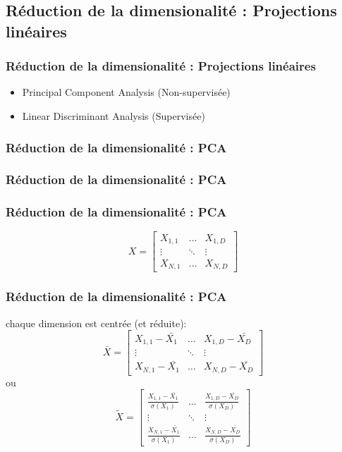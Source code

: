 \subsection{Réduction de la dimensionalité : Projections linéaires}

\begin{frame}
  \frametitle{Réduction de la dimensionalité : Projections linéaires}
    \begin{itemize}
    \item Principal Component Analysis (Non-supervisée)
    \item Linear Discriminant Analysis (Supervisée)
    \end{itemize}
\end{frame}

\begin{frame}
  \frametitle{Réduction de la dimensionalité : PCA}
\end{frame}

\begin{frame}
  \frametitle{Réduction de la dimensionalité : PCA}
\end{frame}

\begin{frame}
  \frametitle{Réduction de la dimensionalité : PCA}
  \[
  X = \begin{bmatrix}
    X_{1,1} & \dots  & X_{1,D} \\
    \vdots & \ddots & \vdots \\
    X_{N,1} & \dots  & X_{N,D}
  \end{bmatrix}
  \]
\end{frame}

\begin{frame}
  \frametitle{Réduction de la dimensionalité : PCA}
  chaque dimension est centrée (et réduite):
  \[
  \bar{X} =
  \begin{bmatrix}
    X_{1,1}-\bar{X_1} & \dots  & X_{1,D}-\bar{X_D} \\
    \vdots & \ddots & \vdots \\
    X_{N,1}-\bar{X_1} & \dots  & X_{N,D}-\bar{X_D}
  \end{bmatrix}
  \]
  ou
  \[
  \tilde{X} =
  \begin{bmatrix}
    \frac{X_{1,1}-\bar{X_1}}{\sigma(X_1)} & \dots  & \frac{X_{1,D}-\bar{X_D}}{\sigma(X_D)} \\
    \vdots & \ddots & \vdots \\
    \frac{X_{N,1}-\bar{X_1}}{\sigma(X_1)} & \dots  & \frac{X_{N,D}-\bar{X_D}}{\sigma(X_D)}
  \end{bmatrix}
  \]
\end{frame}

